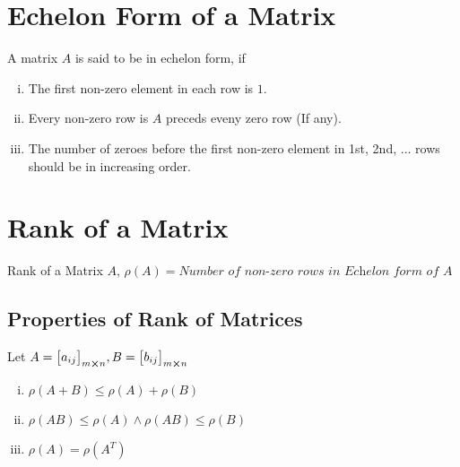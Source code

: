 \documentclass{article}
\begin{document}
\section{Echelon Form of a Matrix}
A matrix $A$ is said to be in echelon form, if
\begin{enumerate}[i.]
    \item The first non-zero element in each row is $1$.
    \item Every non-zero row is $A$ preceds eveny zero row (If any).
    \item The number of zeroes before the first non-zero element in 1st, 2nd, ... rows should be in increasing order.
\end{enumerate}
\section{Rank of a Matrix}
Rank of a Matrix $A$, $\rho(A)=\textit{Number of non-zero rows in Echelon form of A}$
\subsection{Properties of Rank of Matrices}
Let $A={\begin{bmatrix}
    a_{ij}
\end{bmatrix}}_{m \cross n}, B={\begin{bmatrix}
    b_{ij}
\end{bmatrix}}_{m \cross n}$
\begin{enumerate}[i.]
    \item $\rho(A+B)\le \rho(A)+\rho(B)$
    \item $\rho(AB)\le \rho(A) \wedge \rho(AB)\le\rho(B)$
    \item $\rho(A)=\rho(A^T)$
\end{enumerate}
\end{document}
